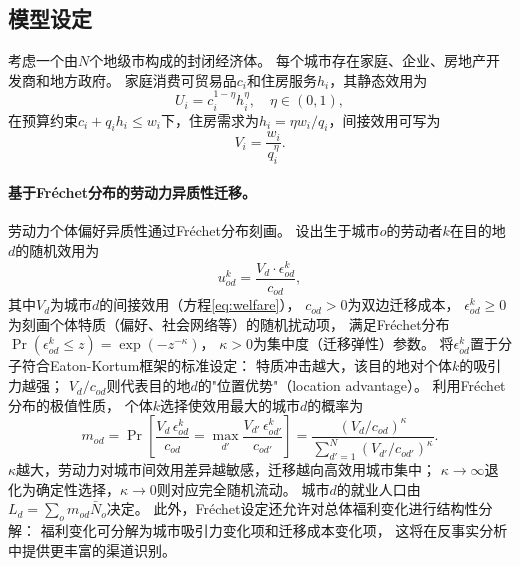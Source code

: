 \documentclass[UTF8,a4paper,12pt]{ctexart}
\theoremstyle{plain}
\theoremstyle{definition}
\theoremstyle{remark}
\begin{document}
\subsection{模型设定}

考虑一个由$N$个地级市构成的封闭经济体。
每个城市存在家庭、企业、房地产开发商和地方政府。
家庭消费可贸易品$c_i$和住房服务$h_i$，其静态效用为
\begin{equation}
  U_i=c_i^{1-\eta}h_i^\eta, \quad \eta\in(0,1),
  \label{eq:utility}
\end{equation}
在预算约束$c_i+q_i h_i\leq w_i$下，住房需求为$h_i=\eta w_i/q_i$，间接效用可写为
\begin{equation}
  V_i=\frac{w_i}{q_i^\eta}.
  \label{eq:welfare}
\end{equation}

\paragraph{基于Fréchet分布的劳动力异质性迁移。}
劳动力个体偏好异质性通过Fréchet分布刻画。
设出生于城市$o$的劳动者$k$在目的地$d$的随机效用为
\begin{equation}
  u_{od}^k = \frac{V_d \cdot \epsilon_{od}^k}{c_{od}},
  \label{eq:random_utility}
\end{equation}
其中$V_d$为城市$d$的间接效用（方程\ref{eq:welfare}），
$c_{od}>0$为双边迁移成本，
$\epsilon_{od}^k\geq 0$为刻画个体特质（偏好、社会网络等）的随机扰动项，
满足Fréchet分布$\Pr(\epsilon_{od}^k\leq z)=\exp(-z^{-\kappa})$，
$\kappa>0$为集中度（迁移弹性）参数。
将$\epsilon_{od}^k$置于分子符合Eaton-Kortum框架的标准设定：
特质冲击越大，该目的地对个体$k$的吸引力越强；
$V_d/c_{od}$则代表目的地$d$的"位置优势"（location advantage）。
利用Fréchet分布的极值性质，
个体$k$选择使效用最大的城市$d$的概率为
\begin{equation}
  m_{od}=\Pr\!\left[\frac{V_d\,\epsilon_{od}^k}{c_{od}}
    =\max_{d'}\frac{V_{d'}\,\epsilon_{od'}^k}{c_{od'}}\right]
  =\frac{(V_d/c_{od})^\kappa}{\sum_{d'=1}^N(V_{d'}/c_{od'})^\kappa}.
  \label{eq:migration}
\end{equation}
$\kappa$越大，劳动力对城市间效用差异越敏感，迁移越向高效用城市集中；
$\kappa\to\infty$退化为确定性选择，$\kappa\to 0$则对应完全随机流动。
城市$d$的就业人口由$L_d=\sum_o m_{od}\bar{N}_o$决定。
此外，Fréchet设定还允许对总体福利变化进行结构性分解：
福利变化可分解为城市吸引力变化项和迁移成本变化项，
这将在反事实分析中提供更丰富的渠道识别。
\end{document}
